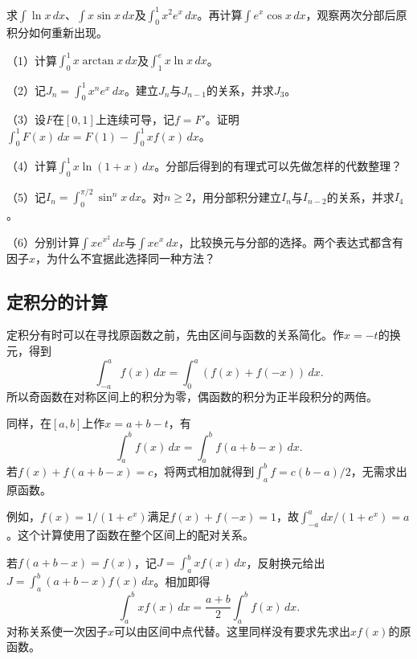 \begin{example}
求\(\int\ln x\,dx\)、\(\int x\sin x\,dx\)及\(\int_0^1 x^2e^x\,dx\)。再计算\(\int e^x\cos x\,dx\)，观察两次分部后原积分如何重新出现。
\end{example}

\begin{exercise}
\mbox{}\par\nobreak

（1）计算\(\int_0^1x\arctan x\,dx\)及\(\int_1^e x\ln x\,dx\)。

（2）记\(J_n=\int_0^1x^ne^x\,dx\)。建立\(J_n\)与\(J_{n-1}\)的关系，并求\(J_3\)。

（3）设\(F\)在\([0,1]\)上连续可导，记\(f=F'\)。证明\(\int_0^1F(x)\,dx=F(1)-\int_0^1xf(x)\,dx\)。

（4）计算\(\int_0^1x\ln(1+x)\,dx\)。分部后得到的有理式可以先做怎样的代数整理？

（5）记\(I_n=\int_0^{\pi/2}\sin^nx\,dx\)。对\(n\ge2\)，用分部积分建立\(I_n\)与\(I_{n-2}\)的关系，并求\(I_4\)。

（6）分别计算\(\int xe^{x^2}\,dx\)与\(\int xe^x\,dx\)，比较换元与分部的选择。两个表达式都含有因子\(x\)，为什么不宜据此选择同一种方法？
\end{exercise}

\newpage
\subsection{定积分的计算}

定积分有时可以在寻找原函数之前，先由区间与函数的关系简化。作\(x=-t\)的换元，得到
\begin{equation*}
 \int_{-a}^a f(x)\,dx=\int_0^a(f(x)+f(-x))\,dx.
\end{equation*}
所以奇函数在对称区间上的积分为零，偶函数的积分为正半段积分的两倍。

同样，在\([a,b]\)上作\(x=a+b-t\)，有
\begin{equation}\label{eq:calculus-integral-reflection}
 \int_a^b f(x)\,dx=\int_a^b f(a+b-x)\,dx.
\end{equation}
若\(f(x)+f(a+b-x)=c\)，将两式相加就得到\(\int_a^b f=c(b-a)/2\)，无需求出原函数。

例如，\(f(x)=1/(1+e^x)\)满足\(f(x)+f(-x)=1\)，故\(\int_{-a}^a dx/(1+e^x)=a\)。这个计算使用了函数在整个区间上的配对关系。

若\(f(a+b-x)=f(x)\)，记\(J=\int_a^bxf(x)\,dx\)，反射换元给出\(J=\int_a^b(a+b-x)f(x)\,dx\)。相加即得
\begin{equation*}
 \int_a^bxf(x)\,dx=\frac{a+b}{2}\int_a^bf(x)\,dx.
\end{equation*}
对称关系使一次因子\(x\)可以由区间中点代替。这里同样没有要求先求出\(xf(x)\)的原函数。

